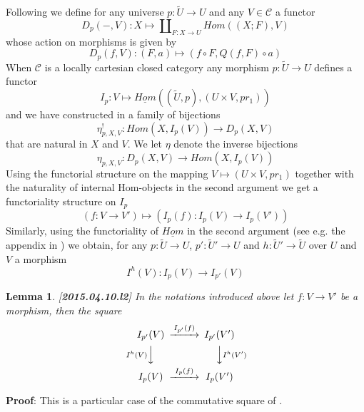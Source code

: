 \documentclass[12pt]{article}
\newenvironment{myproof}{{\bf Proof}:}{\vskip 5mm }
\newtheorem{lemma}[proposition]{Lemma}
\newcommand{\llabel}[1]{\label{#1}[{\bf #1}]}
\newcommand{\sr}{\rightarrow}
\newcommand{\uu}{\underline}
\newcommand{\wt}{\widetilde}
\begin{document}
Following \cite{fromunivwithPi} we define for any universe $p:\wt{U}\sr U$ and any $V\in {\mathcal C}$ a functor
%
$$D_p(-,V):X\mapsto \amalg_{F:X\sr U}Hom((X;F), V)$$
%
whose action on morphisms is given by
%
$$D_p(f,V):(F,a)\mapsto (f\circ F, Q(f,F)\circ a)$$
%
When $\mathcal C$ is a locally cartesian closed category any morphism $p:\wt{U}\sr U$ defines a functor
%
$$I_p:V\mapsto \uu{Hom}((\wt{U},p),(U\times V,pr_1))$$
%
and we have constructed in \cite[Construction 3.9]{fromunivwithPi} a family of bijections
%
$$\eta^!_{p,X,V}:Hom(X,I_p(V))\sr D_p(X,V)$$
%
that are natural in $X$ and $V$. We let $\eta$ denote the inverse bijections 
%
$$\eta_{p,X,V}:D_p(X,V)\sr Hom(X,I_p(V))$$
%
Using the functorial structure on the mapping $V\mapsto (U\times V,pr_1)$ together with the naturality of internal Hom-objects in the second argument we get a functoriality structure on $I_p$
%
$$(f:V\sr V')\mapsto (I_p(f):I_p(V)\sr I_p(V'))$$
%
Similarly, using the functoriality of $\uu{Hom}$ in the second argument (see e.g. the appendix in \cite{fromunivwithPi}) we obtain, for any $p:\wt{U}\sr U$, $p':\wt{U}'\sr U$ and $h:\wt{U}'\sr \wt{U}$ over $U$ and $V$ a morphism
%
$$I^h(V):I_p(V)\sr I_{p'}(V)$$
%
\begin{lemma}
\llabel{2015.04.10.l2}
In the notations introduced above let $f:V\sr V'$ be a morphism, then the square
%
$$
\begin{CD}
I_{p'}(V) @>I_{p'}(f)>> I_{p'}(V')\\
@V{I^h(V)}VV @VV{I^h(V')}V\\
I_p(V) @>I_p(f)>> I_p(V')
\end{CD}
$$
\end{lemma}
%
\begin{myproof}
This is a particular case of the commutative square of \cite[Lemma 8.5]{fromunivwithPi}.
\end{myproof}
\end{document}
